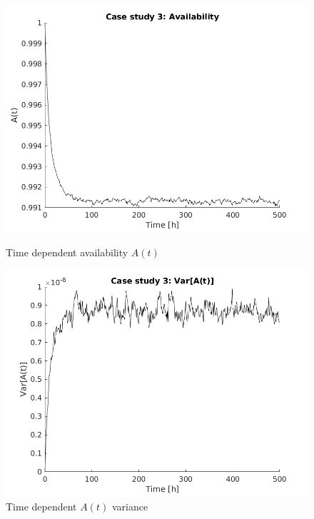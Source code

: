 \documentclass[a4paper,11pt]{article}
\begin{document}
\begin{figure}[ht]
    \centering
    \begin{minipage}{.5\textwidth}
        \centering
        \includegraphics[width=1\linewidth]{Avail3.png}
        \caption{Time dependent availability $A(t)$}
    \end{minipage}%
    \begin{minipage}{.5\textwidth}
        \centering
        \includegraphics[width=1\linewidth]{Avail3_var.png}
        \caption{Time dependent $A(t)$ variance}
    \end{minipage}
\end{figure}
\end{document}
